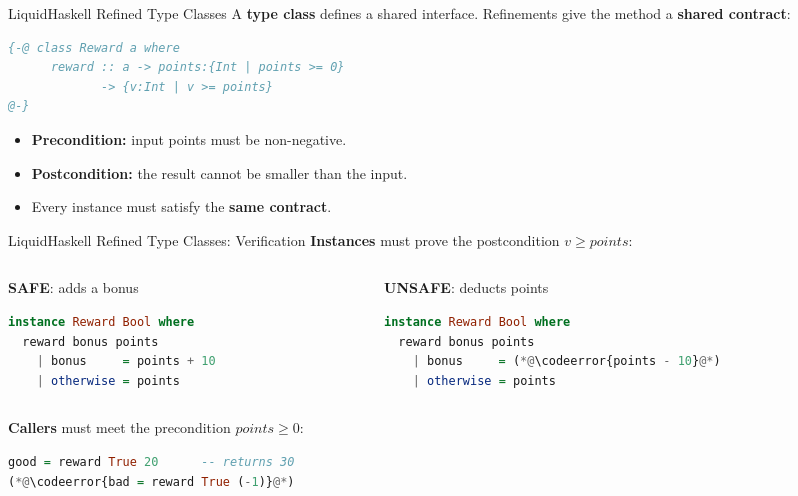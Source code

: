 \documentclass[aspectratio=169]{beamer}
\newcommand{\codeerror}[1]{%
  \begingroup
  \setlength{\fboxsep}{0pt}%
  \colorbox{themeAlert!12}{%
    \hspace{3pt}\color{themeAlert}\ttfamily\strut\detokenize{#1}\hspace{3pt}%
  }%
  \endgroup
}
\begin{document}
\begin{frame}[fragile]{LiquidHaskell Refined Type Classes}
	A \textbf{type class} defines a shared interface. Refinements give the method a \textbf{shared contract}:

	\begin{lstlisting}[language=Haskell]
{-@ class Reward a where
      reward :: a -> points:{Int | points >= 0}
             -> {v:Int | v >= points}
@-}
\end{lstlisting}

	\begin{itemize}
		\item \textbf{Precondition:} input points must be non-negative.
		\item \textbf{Postcondition:} the result cannot be smaller than the input.
		\item Every instance must satisfy the \textbf{same contract}.
	\end{itemize}
\end{frame}

\begin{frame}[fragile]{LiquidHaskell Refined Type Classes: Verification}
	\textbf{Instances} must prove the postcondition \(v \ge points\):

	\begin{columns}[T]
		\begin{column}{0.48\textwidth}
			\textcolor{themeExample}{\textbf{SAFE}}: adds a bonus
			\begin{lstlisting}[language=Haskell]
instance Reward Bool where
  reward bonus points
    | bonus     = points + 10
    | otherwise = points
\end{lstlisting}
		\end{column}
		\begin{column}{0.48\textwidth}
			\textcolor{themeAlert}{\textbf{UNSAFE}}: deducts points
			\begin{lstlisting}[language=Haskell]
instance Reward Bool where
  reward bonus points
    | bonus     = (*@\codeerror{points - 10}@*)
    | otherwise = points
\end{lstlisting}
		\end{column}
	\end{columns}

	\textbf{Callers} must meet the precondition \(points \ge 0\):

	\begin{lstlisting}[language=Haskell]
good = reward True 20      -- returns 30
(*@\codeerror{bad = reward True (-1)}@*)
\end{lstlisting}
\end{frame}
\end{document}
